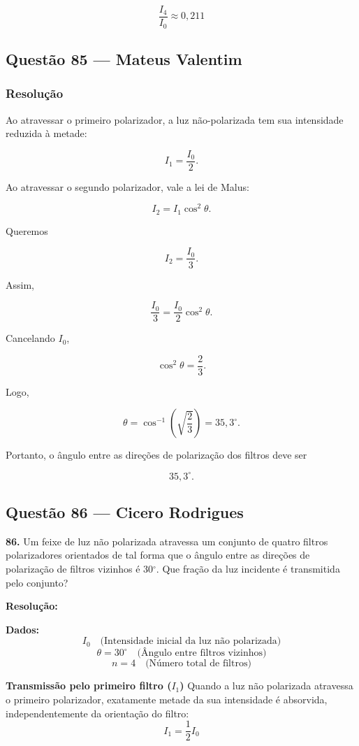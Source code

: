 \documentclass[12pt,a4paper]{article}
\begin{document}
\[
\boxed{\frac{I_4}{I_0} \approx 0,211}
\]

\subsection{Questão 85 — Mateus Valentim}
\subsubsection{Resolução}

Ao atravessar o primeiro polarizador, a luz não-polarizada tem sua intensidade
reduzida à metade:

\[
I_1=\frac{I_0}{2}.
\]

Ao atravessar o segundo polarizador, vale a lei de Malus:

\[
I_2=I_1\cos^2\theta.
\]

Queremos

\[
I_2=\frac{I_0}{3}.
\]

Assim,

\[
\frac{I_0}{3}
=
\frac{I_0}{2}\cos^2\theta.
\]

Cancelando \(I_0\),

\[
\cos^2\theta=\frac{2}{3}.
\]

Logo,

\[
\theta=\cos^{-1}\left(\sqrt{\frac{2}{3}}\right)
=35{,}3^\circ.
\]

Portanto, o ângulo entre as direções de polarização dos filtros deve ser

\[
\boxed{35{,}3^\circ}.
\]

\subsection{Questão 86 — Cicero Rodrigues}

\textbf{86. }\normalfont Um feixe de luz não polarizada atravessa um conjunto de quatro filtros polarizadores orientados de tal forma que o ângulo entre as direções de polarização de filtros vizinhos é 30$^\circ$. Que fração da luz incidente é transmitida pelo conjunto?

\textbf{Resolução:}
\vspace{0.3cm}

\textbf{Dados:}
\[I_0 \quad \text{(Intensidade inicial da luz não polarizada)}\]
\[\theta = 30^\circ \quad \text{(Ângulo entre filtros vizinhos)}\]
\[n = 4 \quad \text{(Número total de filtros)}\]

\vspace{0.2cm}
\textbf{Transmissão pelo primeiro filtro (\(I_1\))}
Quando a luz não polarizada atravessa o primeiro polarizador, exatamente metade da sua intensidade é absorvida, independentemente da orientação do filtro:
\[I_1 = \frac{1}{2}I_0\]
\end{document}

